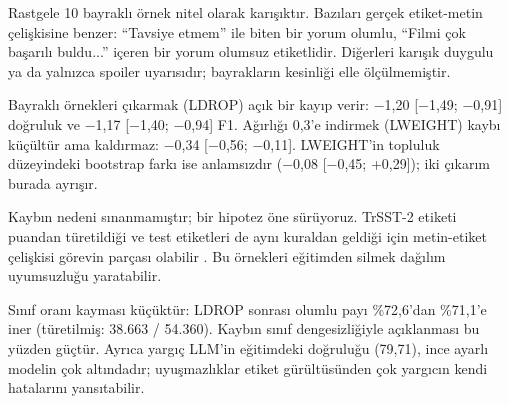 \documentclass[11pt]{article}
\begin{document}
Rastgele 10 bayraklı örnek nitel olarak karışıktır. Bazıları gerçek etiket-metin çelişkisine benzer: ``Tavsiye etmem'' ile biten bir yorum olumlu, ``Filmi çok başarılı buldu...'' içeren bir yorum olumsuz etiketlidir. Diğerleri karışık duygulu ya da yalnızca spoiler uyarısıdır; bayrakların kesinliği elle ölçülmemiştir.

\begin{table}[!htbp]
\centering
\footnotesize
\setlength{\tabcolsep}{3pt}
\caption{LLM bayraklarına dayalı eğitim kümesi müdahaleleri (TrSST-2, 5 seed). Topluluk düzeyindeki bootstrap farkları Tablo~\ref{tab:10}'dadır.}
\label{tab:17}
\end{table}

Bayraklı örnekleri çıkarmak (LDROP) açık bir kayıp verir: $-$1,20 [$-$1,49; $-$0,91] doğruluk ve $-$1,17 [$-$1,40; $-$0,94] F1. Ağırlığı 0,3'e indirmek (LWEIGHT) kaybı küçültür ama kaldırmaz: $-$0,34 [$-$0,56; $-$0,11]. LWEIGHT'in topluluk düzeyindeki bootstrap farkı ise anlamsızdır ($-$0,08 [$-$0,45; +0,29]); iki çıkarım burada ayrışır.

Kaybın nedeni sınanmamıştır; bir hipotez öne sürüyoruz. TrSST-2 etiketi puandan türetildiği ve test etiketleri de aynı kuraldan geldiği için metin-etiket çelişkisi görevin parçası olabilir \citep{altinok2025}. Bu örnekleri eğitimden silmek dağılım uyumsuzluğu yaratabilir.

Sınıf oranı kayması küçüktür: LDROP sonrası olumlu payı \%72,6'dan \%71,1'e iner (türetilmiş: 38.663 / 54.360). Kaybın sınıf dengesizliğiyle açıklanması bu yüzden güçtür. Ayrıca yargıç LLM'in eğitimdeki doğruluğu (79,71), ince ayarlı modelin çok altındadır; uyuşmazlıklar etiket gürültüsünden çok yargıcın kendi hatalarını yansıtabilir.
\end{document}
